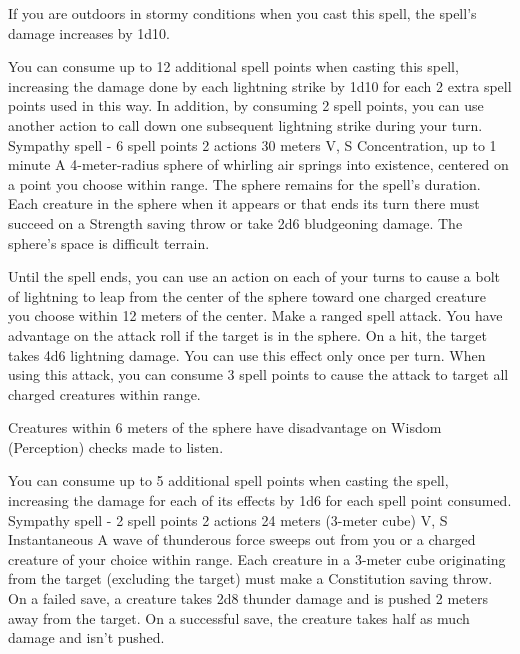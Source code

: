         If you are outdoors in stormy conditions when you cast this spell, the spell's damage increases by 1d10.

        You can consume up to 12 additional spell points when casting this spell, increasing the damage done by each lightning strike by 1d10 for each 2 extra spell points used in this way.
        In addition, by consuming 2 spell points, you can use another action to call down one subsequent lightning strike during your turn.
        {Sympathy spell - 6 spell points}
        {2 actions}
        {30 meters}
        {V, S}
        {Concentration, up to 1 minute}
        A 4-meter-radius sphere of whirling air springs into existence, centered on a point you choose within range.
        The sphere remains for the spell's duration.
        Each creature in the sphere when it appears or that ends its turn there must succeed on a Strength saving throw or take 2d6 bludgeoning damage.
        The sphere's space is difficult terrain.

        Until the spell ends, you can use an action on each of your turns to cause a bolt of lightning to leap from the center of the sphere toward one charged creature you choose within 12 meters of the center.
        Make a ranged spell attack.
        You have advantage on the attack roll if the target is in the sphere.
        On a hit, the target takes 4d6 lightning damage.
        You can use this effect only once per turn.
        When using this attack, you can consume 3 spell points to cause the attack to target all charged creatures within range.

        Creatures within 6 meters of the sphere have disadvantage on Wisdom (Perception) checks made to listen.

        You can consume up to 5 additional spell points when casting the spell, increasing the damage for each of its effects by 1d6 for each spell point consumed.
        {Sympathy spell - 2 spell points}
        {2 actions}
        {24 meters (3-meter cube)}
        {V, S}
        {Instantaneous}
        A wave of thunderous force sweeps out from you or a charged creature of your choice within range.
        Each creature in a 3-meter cube originating from the target (excluding the target) must make a Constitution saving throw.
        On a failed save, a creature takes 2d8 thunder damage and is pushed 2 meters away from the target.
        On a successful save, the creature takes half as much damage and isn't pushed.

